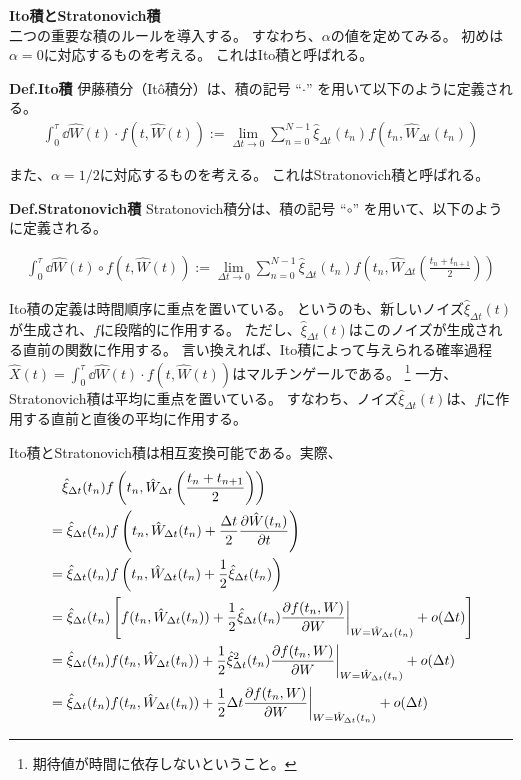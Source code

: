\documentclass[a4paper,11pt]{jsarticle}
\numberwithin{equation}{section}
\begin{document}
\textbf{Ito積とStratonovich積}\\
二つの重要な積のルールを導入する。
すなわち、$\alpha$の値を定めてみる。
初めは$\alpha = 0$に対応するものを考える。
これはIto積と呼ばれる。
\begin{itembox}[l]{\textbf{Def.Ito積}}
    伊藤積分（Itô積分）は、積の記号 “\(\cdot\)” を用いて以下のように定義される。
    \begin{align}
    \int_0^\tau \dd{\hat{W}(t)} \cdot f(t, \hat{W}(t)) := \lim_{\Delta t \to 0} \sum_{n=0}^{N-1} \hat{\xi}_{\Delta t}(t_n) f(t_n, \hat{W}_{\Delta t}(t_n))
    \end{align}
    \end{itembox}
    また、$\alpha =1/2$に対応するものを考える。
    これはStratonovich積と呼ばれる。
    \begin{itembox}[l]{\textbf{Def.Stratonovich積}}
      Stratonovich積分は、積の記号 “\(\circ\)” を用いて、以下のように定義される。

    \begin{align}
    \int_0^\tau \dd{\hat{W}(t)} \circ f(t, \hat{W}(t)) := \lim_{\Delta t \to 0} \sum_{n=0}^{N-1} \hat{\xi}_{\Delta t}(t_n) f\left( t_n, \hat{W}_{\Delta t} \left( \frac{t_n + t_{n+1}}{2} \right) \right)
    \end{align}
    \end{itembox}
Ito積の定義は時間順序に重点を置いている。
というのも、新しいノイズ$\hat{\xi}_{\Delta t}(t)$が生成され、$f$に段階的に作用する。
ただし、$\hat{\xi}_{\Delta t}(t)$はこのノイズが生成される直前の関数に作用する。
言い換えれば、Ito積によって与えられる確率過程$\hat{X}(t) = \int_{0}^{\tau} \dd \hat{W}(t) \cdot f(t, \hat{W}(t))$はマルチンゲールである。
\footnote{期待値が時間に依存しないということ。}
一方、Stratonovich積は平均に重点を置いている。
すなわち、ノイズ$\hat{\xi}_{\Delta t}(t)$は、$f$に作用する直前と直後の平均に作用する。

Ito積とStratonovich積は相互変換可能である。実際、
\begin{align}
&\quad \hat{\xi}_{\Delta t}(t_n) f\left( t_n, \hat{W}_{\Delta t} \left( \frac{t_n + t_{n+1}}{2} \right) \right)\\
&= \hat{\xi}_{\Delta t}(t_n) f\left( t_n, \hat{W}_{\Delta t}(t_n) + \frac{\Delta t}{2} \pdv{\hat{W}(t_{n})}{t}  (t_n) \right)  \\
&= \hat{\xi}_{\Delta t}(t_n) f\left( t_n, \hat{W}_{\Delta t}(t_n) + \frac{1}{2} \hat{\xi}_{\Delta t}(t_n) \right) \\
&= \hat{\xi}_{\Delta t}(t_n) \left[ f(t_n, \hat{W}_{\Delta t}(t_n)) + \frac{1}{2} \hat{\xi}_{\Delta t}(t_n) \pdv{f(t_n, W)}{W} \biggr|_{W = \hat{W}_{\Delta t}(t_n)} + o(\Delta t) \right] \\
&= \hat{\xi}_{\Delta t}(t_n) f(t_n, \hat{W}_{\Delta t}(t_n)) + \frac{1}{2} \hat{\xi}_{\Delta t}^2(t_n) \pdv{f(t_n, W)}{W} \biggr|_{W = \hat{W}_{\Delta t}(t_n)} + o(\Delta t) \\
&= \hat{\xi}_{\Delta t}(t_n) f(t_n, \hat{W}_{\Delta t}(t_n)) + \frac{1}{2} \Delta t \pdv{f(t_n, W)}{W} \biggr|_{W = \hat{W}_{\Delta t}(t_n)} + o(\Delta t)
\end{align}
\end{document}
